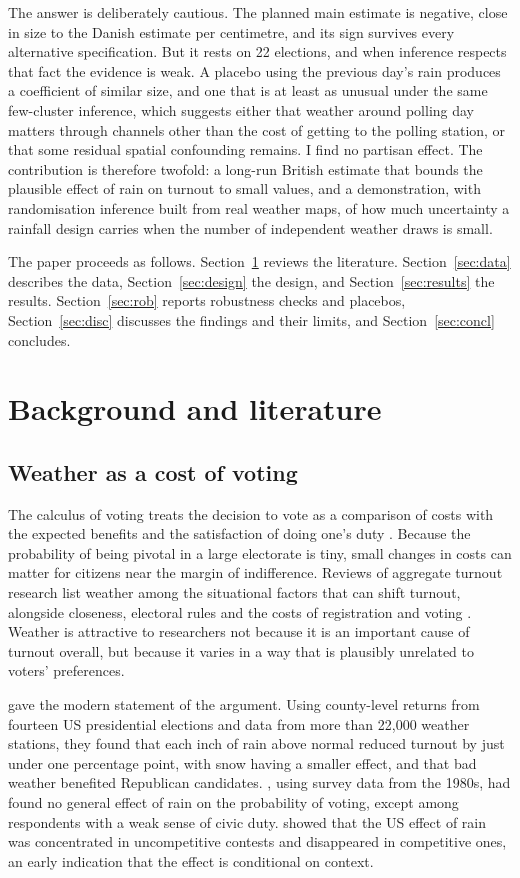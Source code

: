 \documentclass[11pt,a4paper]{article}
\begin{document}
The answer is deliberately cautious. The planned main estimate is negative, close in size to the Danish estimate per centimetre, and its sign survives every alternative specification. But it rests on 22 elections, and when inference respects that fact the evidence is weak. A placebo using the previous day's rain produces a coefficient of similar size, and one that is at least as unusual under the same few-cluster inference, which suggests either that weather around polling day matters through channels other than the cost of getting to the polling station, or that some residual spatial confounding remains. I find no partisan effect. The contribution is therefore twofold: a long-run British estimate that bounds the plausible effect of rain on turnout to small values, and a demonstration, with randomisation inference built from real weather maps, of how much uncertainty a rainfall design carries when the number of independent weather draws is small.

The paper proceeds as follows. Section~\ref{sec:lit} reviews the literature. Section~\ref{sec:data} describes the data, Section~\ref{sec:design} the design, and Section~\ref{sec:results} the results. Section~\ref{sec:rob} reports robustness checks and placebos, Section~\ref{sec:disc} discusses the findings and their limits, and Section~\ref{sec:concl} concludes.

\section{Background and literature}\label{sec:lit}
\subsection{Weather as a cost of voting}
The calculus of voting treats the decision to vote as a comparison of costs with the expected benefits and the satisfaction of doing one's duty \citep{downs1957,rikerordeshook1968}. Because the probability of being pivotal in a large electorate is tiny, small changes in costs can matter for citizens near the margin of indifference. Reviews of aggregate turnout research list weather among the situational factors that can shift turnout, alongside closeness, electoral rules and the costs of registration and voting \citep{geys2006,blais2006}. Weather is attractive to researchers not because it is an important cause of turnout overall, but because it varies in a way that is plausibly unrelated to voters' preferences.

\citet{gomez2007} gave the modern statement of the argument. Using county-level returns from fourteen US presidential elections and data from more than 22,000 weather stations, they found that each inch of rain above normal reduced turnout by just under one percentage point, with snow having a smaller effect, and that bad weather benefited Republican candidates. \citet{knack1994}, using survey data from the 1980s, had found no general effect of rain on the probability of voting, except among respondents with a weak sense of civic duty. \citet{fragahersh2010} showed that the US effect of rain was concentrated in uncompetitive contests and disappeared in competitive ones, an early indication that the effect is conditional on context.
\end{document}
